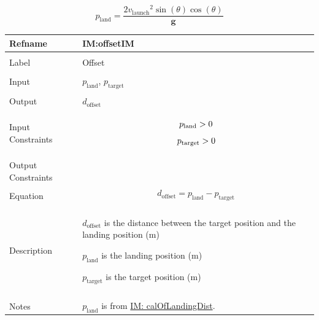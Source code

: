\documentclass[12pt]{article}
\newcommand{\gt}{\ensuremath >}
\begin{document}
\begin{displaymath}
{p_{\text{land}}}=\frac{2 {v_{\text{launch}}}^{2} \sin\left(θ\right) \cos\left(θ\right)}{\mathbf{g}}
\end{displaymath}
\vspace{\baselineskip}
\noindent
\begin{minipage}{\textwidth}
\begin{tabular}{>{\raggedright}p{}>{\raggedright\arraybackslash}p{}}
\toprule \textbf{Refname} & \textbf{IM:offsetIM}
\label{IM:offsetIM}
\\ \midrule \\
Label & Offset
        
\\ \midrule \\
Input & ${p_{\text{land}}}$, ${p_{\text{target}}}$
        
\\ \midrule \\
Output & ${d_{\text{offset}}}$
         
\\ \midrule \\
Input Constraints & \begin{displaymath}
                    {p_{\text{land}}}\gt{}0
                    \end{displaymath}
                    \begin{displaymath}
                    {p_{\text{target}}}\gt{}0
                    \end{displaymath}
\\ \midrule \\
Output Constraints & 
\\ \midrule \\
Equation & \begin{displaymath}
           {d_{\text{offset}}}={p_{\text{land}}}-{p_{\text{target}}}
           \end{displaymath}
\\ \midrule \\
Description & \begin{symbDescription}
              \item{${d_{\text{offset}}}$ is the distance between the target position and the landing position (${\text{m}}$)}
              \item{${p_{\text{land}}}$ is the landing position (${\text{m}}$)}
              \item{${p_{\text{target}}}$ is the target position (${\text{m}}$)}
              \end{symbDescription}
\\ \midrule \\
Notes & ${p_{\text{land}}}$ is from \hyperref[IM:calOfLandingDist]{IM: calOfLandingDist}.
        

\end{tabular}
\end{minipage}
\end{document}
